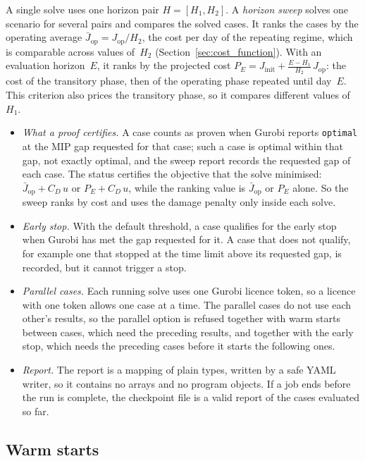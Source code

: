 \documentclass[11pt,a4paper]{article}
\theoremstyle{plain}
\theoremstyle{definition}
\theoremstyle{remark}
\begin{document}
A single solve uses one horizon pair $H = [H_1, H_2]$.
A \emph{horizon sweep} solves one scenario for several pairs and compares the solved cases.
It ranks the cases by the operating average $\bar J_{\mathrm{op}} = J_{\mathrm{op}}/H_2$, the cost per day of the repeating regime, which is comparable across values of~$H_2$ (Section~\ref{sec:cost_function}).
With an evaluation horizon~$E$, it ranks by the projected cost $P_E = J_{\mathrm{init}} + \frac{E - H_1}{H_2}\,J_{\mathrm{op}}$: the cost of the transitory phase, then of the operating phase repeated until day~$E$.
This criterion also prices the transitory phase, so it compares different values of~$H_1$.
\begin{itemize}[nosep]
  \item \emph{What a proof certifies.} A case counts as proven when Gurobi reports \texttt{optimal} at the MIP gap requested for that case; such a case is optimal within that gap, not exactly optimal, and the sweep report records the requested gap of each case.
    The status certifies the objective that the solve minimised: $\bar J_{\mathrm{op}} + C_D\,u$ or $P_E + C_D\,u$, while the ranking value is $\bar J_{\mathrm{op}}$ or $P_E$ alone.
    So the sweep ranks by cost and uses the damage penalty only inside each solve.
  \item \emph{Early stop.} With the default threshold, a case qualifies for the early stop when Gurobi has met the gap requested for it.
    A case that does not qualify, for example one that stopped at the time limit above its requested gap, is recorded, but it cannot trigger a stop.
  \item \emph{Parallel cases.} Each running solve uses one Gurobi licence token, so a licence with one token allows one case at a time.
    The parallel cases do not use each other's results, so the parallel option is refused together with warm starts between cases, which need the preceding results, and together with the early stop, which needs the preceding cases before it starts the following ones.
  \item \emph{Report.} The report is a mapping of plain types, written by a safe YAML writer, so it contains no arrays and no program objects.
    If a job ends before the run is complete, the checkpoint file is a valid report of the cases evaluated so far.
\end{itemize}

\subsection{Warm starts}
\label{sec:impl_warm}
\end{document}
